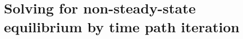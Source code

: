 \documentclass[letterpaper,12pt]{article}
\theoremstyle{definition}
\renewcommand\theenumi{\roman{enumi}}
\begin{document}
\newpage
\section{Solving for non-steady-state equilibrium by time path iteration}\label{AppNonSSsolve}

  \setcounter{equation}{0}
  \renewcommand\theenumi{\arabic{enumi}}
  \renewcommand\theenumii{\alph{enumii}}
  \renewcommand\theenumiii{\roman{enumiii}}

\end{document}
